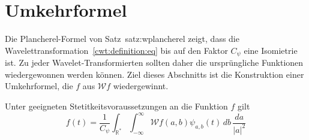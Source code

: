 %
%
%
\section{Umkehrformel%
\label{section:cwt:umkehrformel}}
Die Plancherel-Formel von Satz~{satz:wplancherel} zeigt, dass die
Wavelettransformation~\eqref{cwt:definition:eq} bis auf den Faktor
$C_{\psi}$ eine Isomietrie ist.
Zu jeder Wavelet-Transformierten sollten daher die ursprüngliche
Funktionen wiedergewonnen werden können.
Ziel dieses Abschnitts ist die Konstruktion einer Umkehrformel, 
die $f$ aus $\mathcal{W}f$ wiedergewinnt.

\begin{satz}
Unter geeigneten Stetitkeitsvoraussetzungen an die Funktion $f$ gilt
\begin{equation}
f(t) = \frac{1}{C_{\psi}}\int_{\mathbb R^*}\int_{-\infty}^\infty
\mathcal{W}f(a,b) \psi_{a,b}(t)
\,db\,\frac{da}{|a|^2}
\label{cwt:umkehr}
\end{equation}
\end{satz}

